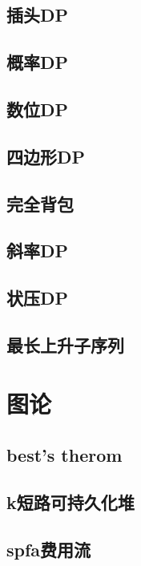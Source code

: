 \documentclass[a4paper]{article}
\begin{document}
\subsection{插头DP}

\subsection{概率DP}

\subsection{数位DP}

\subsection{四边形DP}

\subsection{完全背包}

\subsection{斜率DP}

\subsection{状压DP}

\subsection{最长上升子序列}

\section{图论}
\subsection{best's therom}

\subsection{k短路可持久化堆}

\subsection{spfa费用流}

\end{document}
